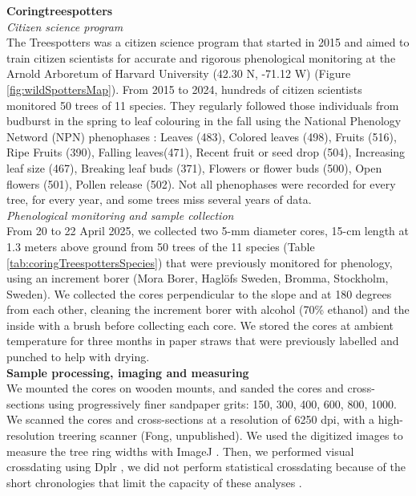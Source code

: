 \documentclass{article}
\begin{document}
\textbf{Coringtreespotters} \\
\textit{Citizen science program} \\
The Treespotters was a citizen science program that started in 2015 and aimed to train citizen scientists for accurate and rigorous phenological monitoring at the Arnold Arboretum of Harvard University (42.30 \degree N, -71.12 \degree W) (Figure \ref{fig:wildSpottersMap}). From 2015 to 2024, hundreds of citizen scientists monitored 50 trees of 11 species. They regularly followed those individuals from budburst in the spring to leaf colouring in the fall using the National Phenology Netword (NPN) phenophases \citep{denny_standardized_2014}: Leaves (483), Colored leaves (498), Fruits (516), Ripe Fruits (390), Falling leaves(471), Recent fruit or seed drop (504), Increasing leaf size (467), Breaking leaf buds (371), Flowers or flower buds (500), Open flowers (501), Pollen release (502). Not all phenophases were recorded for every tree, for every year, and some trees miss several years of data. \\

\textit{Phenological monitoring and sample collection} \\
From 20 to 22 April 2025, we collected two 5-mm diameter cores, 15-cm length at 1.3 meters above ground from 50 trees of the 11 species (Table \ref{tab:coringTreespottersSpecies}) that were previously monitored for phenology, using an increment borer (Mora Borer, Haglöfs Sweden, Bromma, Stockholm, Sweden). We collected the cores perpendicular to the slope and at 180 degrees from each other, cleaning the increment borer with alcohol (70\% ethanol) and the inside with a brush before collecting each core. We stored the cores at ambient temperature for three months in paper straws that were previously labelled and punched to help with drying. \\

\textbf{Sample processing, imaging and measuring} \\
We mounted the cores on wooden mounts, and sanded the cores and cross-sections using progressively finer sandpaper grits: 150, 300, 400, 600, 800, 1000. We scanned the cores and cross-sections at a resolution of 6250 dpi, with a high-resolution treering scanner (Fong, unpublished). We used the digitized images to measure the tree ring widths with ImageJ \citep{schneider_nih_2012}. Then, we performed visual crossdating using Dplr \citep{bunn_statistical_2010}, we did not perform statistical crossdating because of the short chronologies that limit the capacity of these analyses \citep{raden_potential_2020}. \\
\end{document}
